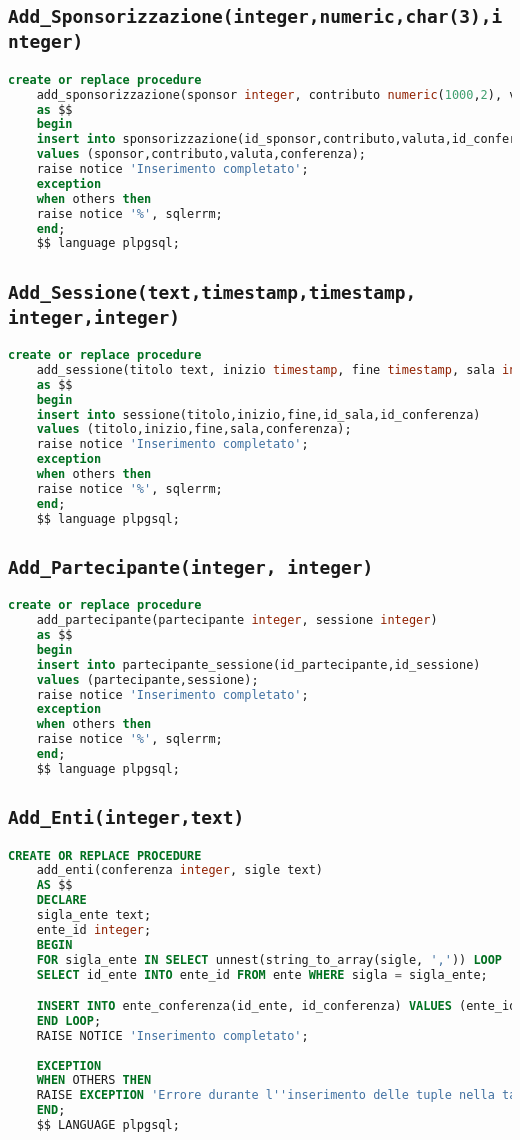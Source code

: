 \subsection{\texttt{Add\_Sponsorizzazione(integer,numeric,char(3),integer)}}
\begin{lstlisting}[language=SQL, style=mystyle]
	create or replace procedure 
	add_sponsorizzazione(sponsor integer, contributo numeric(1000,2), valuta char(3), conferenza integer)
	as $$
	begin
	insert into sponsorizzazione(id_sponsor,contributo,valuta,id_conferenza)
	values (sponsor,contributo,valuta,conferenza);
	raise notice 'Inserimento completato';
	exception
	when others then
	raise notice '%', sqlerrm;
	end;
	$$ language plpgsql;
\end{lstlisting}
\subsection{\texttt{Add\_Sessione(text,timestamp,timestamp, integer,integer)}}
\begin{lstlisting}[language=SQL, style=mystyle]
	create or replace procedure 
	add_sessione(titolo text, inizio timestamp, fine timestamp, sala integer, conferenza integer)
	as $$
	begin
	insert into sessione(titolo,inizio,fine,id_sala,id_conferenza)
	values (titolo,inizio,fine,sala,conferenza);
	raise notice 'Inserimento completato';
	exception
	when others then
	raise notice '%', sqlerrm;
	end;
	$$ language plpgsql;
\end{lstlisting}
\subsection{\texttt{Add\_Partecipante(integer, integer)}}
\begin{lstlisting}[language=SQL, style=mystyle]
	create or replace procedure 
	add_partecipante(partecipante integer, sessione integer)
	as $$
	begin
	insert into partecipante_sessione(id_partecipante,id_sessione)
	values (partecipante,sessione);
	raise notice 'Inserimento completato';
	exception
	when others then
	raise notice '%', sqlerrm;
	end;
	$$ language plpgsql;
\end{lstlisting}
\subsection{\texttt{Add\_Enti(integer,text)}}
\begin{lstlisting}[language=SQL, style=mystyle]
	CREATE OR REPLACE PROCEDURE 
	add_enti(conferenza integer, sigle text)
	AS $$
	DECLARE
	sigla_ente text;
	ente_id integer;
	BEGIN
	FOR sigla_ente IN SELECT unnest(string_to_array(sigle, ',')) LOOP
	SELECT id_ente INTO ente_id FROM ente WHERE sigla = sigla_ente;

	INSERT INTO ente_conferenza(id_ente, id_conferenza) VALUES (ente_id, conferenza);
	END LOOP;
	RAISE NOTICE 'Inserimento completato';
	
	EXCEPTION
	WHEN OTHERS THEN
	RAISE EXCEPTION 'Errore durante l''inserimento delle tuple nella tabella ente_conferenza: %', SQLERRM;
	END;
	$$ LANGUAGE plpgsql;
\end{lstlisting}
